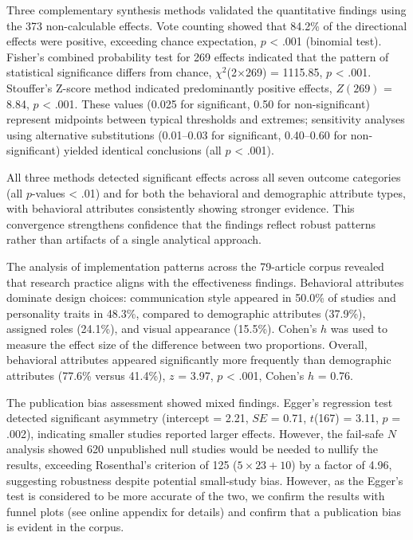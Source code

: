 \documentclass[manuscript,screen,review,anonymous]{acmart}
\begin{document}
Three complementary synthesis methods validated the quantitative findings using the 373 non-calculable effects. Vote counting showed that 84.2\% of the directional effects were positive, exceeding chance expectation, $p$ < .001 (binomial test). Fisher's combined probability test for 269 effects indicated that the pattern of statistical significance differs from chance, $\chi^2$(2$\times$269) = 1115.85, $p$ < .001. Stouffer's Z-score method indicated predominantly positive effects, $Z(269)$ = 8.84, $p$ < .001. These values (0.025 for significant, 0.50 for non-significant) represent midpoints between typical thresholds and extremes; sensitivity analyses using alternative substitutions (0.01–0.03 for significant, 0.40–0.60 for non-significant) yielded identical conclusions (all $p$ < .001).

All three methods detected significant effects across all seven outcome categories (all $p$-values < .01) and for both the behavioral and demographic attribute types, with behavioral attributes consistently showing stronger evidence. This convergence strengthens confidence that the findings reflect robust patterns rather than artifacts of a single analytical approach.

The analysis of implementation patterns across the 79-article corpus revealed that research practice aligns with the effectiveness findings. Behavioral attributes dominate design choices: communication style appeared in 50.0\% of studies and personality traits in 48.3\%, compared to demographic attributes (37.9\%), assigned roles (24.1\%), and visual appearance (15.5\%). Cohen's $h$ was used to measure the effect size of the difference between two proportions. Overall, behavioral attributes appeared significantly more frequently than demographic attributes (77.6\% versus 41.4\%), $z$ = 3.97, $p$ < .001, Cohen's $h$ = 0.76.


The publication bias assessment showed mixed findings. Egger's regression test detected significant asymmetry (intercept = 2.21, $SE$ = 0.71, $t$(167) = 3.11, $p$ = .002), indicating smaller studies reported larger effects. However, the fail-safe $N$ analysis showed 620 unpublished null studies would be needed to nullify the results, exceeding Rosenthal's criterion \cite{rosenthal1979file} of 125 ($5\times23+10$) by a factor of 4.96, suggesting robustness despite potential small-study bias. However, as the Egger's test is considered to be more accurate of the two, we confirm the results with funnel plots (see online appendix for details) and confirm that a publication bias is evident in the corpus.
\end{document}
